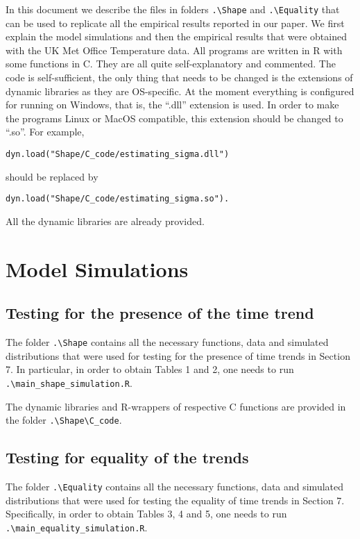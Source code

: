 \documentclass[a4paper,12pt]{article}
\begin{document}


\version{\today}

In this document we describe the files in folders  \verb|.\Shape| and \verb|.\Equality| that can be used to replicate all the empirical results reported in our paper. We first explain the model simulations and then the empirical results that were obtained with the UK Met Office Temperature data. All programs are written in R with some functions in C. They are all quite self-explanatory and commented. The code is self-sufficient, the only thing that needs to be changed is the extensions of dynamic libraries as they are OS-specific. At the moment everything is configured for running on Windows, that is, the ``.dll'' extension is used. In order to make the programs Linux or MacOS compatible, this extension should be changed to ``.so''. For example, 
\begin{verbatim}
dyn.load("Shape/C_code/estimating_sigma.dll")
\end{verbatim} should be replaced by
\begin{verbatim}
dyn.load("Shape/C_code/estimating_sigma.so").
\end{verbatim}

All the dynamic libraries are already provided.

\section{Model Simulations}
\subsection{Testing for the presence of the time trend}
The folder \verb|.\Shape| contains all the necessary functions, data and simulated distributions that were used for testing for the presence of time trends in Section 7. In particular, in order to obtain Tables 1 and 2, one needs to run \verb|.\main_shape_simulation.R|.


The dynamic libraries and R-wrappers of respective C functions are provided in the folder \verb|.\Shape\C_code|. 

\subsection{Testing for equality of the trends}
The folder \verb|.\Equality| contains all the necessary functions, data and simulated distributions that were used for testing the equality of time trends in Section 7. Specifically, in order to obtain Tables 3, 4 and 5, one needs to run \verb|.\main_equality_simulation.R|.
\end{document}
